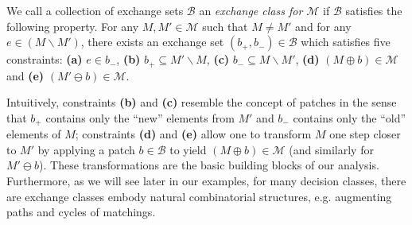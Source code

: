 \documentclass{article}
\newcommand{\wei}[1]{}
\newcommand{\wei}[1]{{\color{blue!50!black}  [\text{Wei:} #1]}}
\newcommand{\M}{\mathcal M}
\newcommand{\B}{\mathcal B}
\newcommand{\del}{\backslash}
\begin{document}
We call a collection of exchange sets $\B$ an \emph{exchange class for $\M$} if $\B$ satisfies the following property.
For any $M,M'\in \M$ such that $M\not = M'$  and for any $e\in (M\del M')$, there exists an exchange set $(b_+,b_-)\in \B$ which satisfies five constraints: \textbf{(a)} $e\in b_-$, \textbf{(b)} $b_+ \subseteq M'\del M$, \textbf{(c)} $b_- \subseteq M \del M'$, \textbf{(d)} $(M\oplus b) \in \M$ and \textbf{(e)} $(M'\ominus b) \in \M$.

Intuitively, constraints \textbf{(b)} and \textbf{(c)} resemble the concept of patches in the sense that $b_+$ contains only the ``new'' elements from $M'$ and $b_-$ contains only the ``old'' elements of $M$; constraints \textbf{(d)} and  \textbf{(e)} allow one to transform $M$ one step closer to $M'$ by applying  a patch $b\in \B$ to yield $(M\oplus b) \in \M$ (and similarly for $M'\ominus b$).
These transformations are the basic building blocks of our analysis.
Furthermore, as we will see later in our examples, for many decision classes, there are exchange classes embody natural combinatorial structures, e.g. augmenting paths and cycles of matchings.
\end{document}
